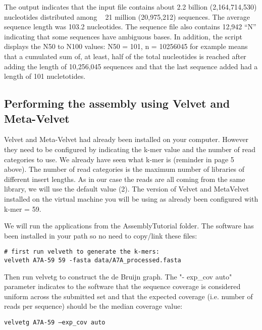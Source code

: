 The output indicates that the input file contains about 2.2 billion (2,164,714,530) nucleotides distributed among ~ 21 million (20,975,212) sequences. The average sequence length was 103.2 nucleotides. The sequence file also contains 12,942 “N” indicating that some sequences have ambiguous bases. In addition, the script displays the N50 to N100 values: 
N50 = 101, n = 10256045 for example means that a cumulated sum of, at least, half of the total nucleotides is reached after adding the length of 10,256,045 sequences and that the last sequence added had a length of 101 nucletotides.

\subsection{Performing the assembly using Velvet and Meta-Velvet}

Velvet and Meta-Velvet had already been installed on your computer. However they need to be configured by indicating the k-mer value and the number of read categories to use. We already have seen what k-mer is (reminder in page 5 above). The number of read categories is the maximum number of libraries of different insert lengths. As in our case the reads are all coming from the same library, we will use the default value (2).
The version of Velvet and MetaVelvet installed on the virtual machine you will be using as already been configured with k-mer = 59.

\begin{steps}
We will run the applications from the AssemblyTutorial folder. The software has been installed in your path so no need to copy/link these files:
\begin{lstlisting}
# first run velveth to generate the k-mers:
velveth A7A-59 59 -fasta data/A7A_processed.fasta 
\end{lstlisting}
\end{steps}

\begin{steps}
Then run velvetg to construct the de Bruijn graph. The "- exp_cov auto" parameter indicates to the software that the sequence coverage is considered uniform across the submitted set and that the expected coverage (i.e. number of reads per sequence) should be the median coverage value:
\begin{lstlisting}
velvetg A7A-59 –exp_cov auto
\end{lstlisting}
\end{steps}

